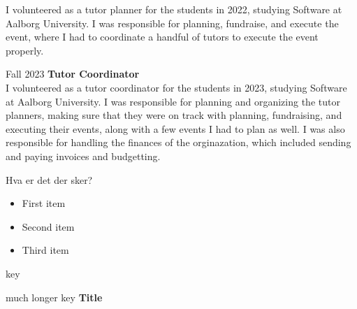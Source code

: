 \documentclass[a4paper]{report}
\begin{document}
\begin{cv}
    I volunteered as a tutor planner for the students in 2022, studying Software at Aalborg University.
    I was responsible for planning, fundraise, and execute the event, where I had to coordinate a handful of tutors to execute the event properly.
\item[Fall 2023] \textbf{Tutor Coordinator}\\
    I volunteered as a tutor coordinator for the students in 2023, studying Software at Aalborg University.
    I was responsible for planning and organizing the tutor planners, making sure that they were on track with planning, fundraising, and executing their events, along with a few events I had to plan as well.
    I was also responsible for handling the finances of the orginazation, which included sending and paying invoices and budgetting.
\end{cv}
\showsep Hva er det der sker? %


\begin{itemize}[label=\textbar, left=0pt]
    \item First item
    \item Second item
    \item Third item
\end{itemize}
\begin{cv}
\item[key] \lipsum[1-3]
\item[much longer key] \textbf{Title}\\\lipsum[1-10]
\end{cv}
\fi
\end{document}
